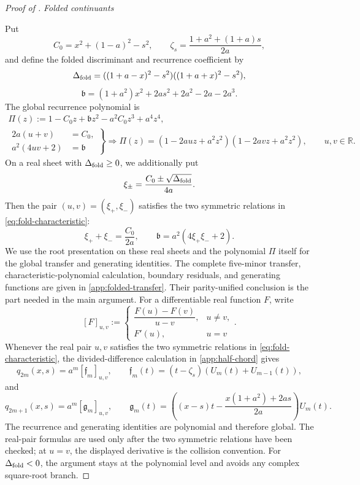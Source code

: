 \documentclass[12pt,anonymous]{iopjournal}
\numberwithin{equation}{section}
\theoremstyle{remark}
\newcommand{\proofstage}[1]{%
  \par\medskip\noindent\textit{#1}\par\nobreak\smallskip}
\begin{document}
\begin{proof}[Proof of ]
\proofstage{Folded continuants}
Put
\[
 C_0=x^2+(1-a)^2-s^2,\qquad
 \zeta_s=\frac{1+a^2+(1+a)s}{2a},
\]
and define the folded discriminant and recurrence coefficient by
\[
 \Delta_{\rm fold}=((1+a-x)^2-s^2)((1+a+x)^2-s^2),
\]
\[
 \mathfrak b=(1+a^2)x^2+2as^2+2a^2-2a-2a^3.
\]
The global recurrence polynomial is
\begin{equation}\label{eq:fold-characteristic}
\begin{gathered}
 \Pi(z):=1-C_0z+\mathfrak b z^2-a^2C_0z^3+a^4z^4,\\
 \left.
 \begin{aligned}
  2a(u+v)&=C_0,\\
  a^2(4uv+2)&=\mathfrak b
 \end{aligned}
 \right\}
 \Longrightarrow
 \Pi(z)=(1-2auz+a^2z^2)(1-2avz+a^2z^2),
 \qquad u,v\in\mathbb R.
\end{gathered}
\end{equation}
On a real sheet with \(\Delta_{\rm fold}\geq0\), we additionally put
\[
 \xi_\pm=\frac{C_0\pm\sqrt{\Delta_{\rm fold}}}{4a}.
\]
Then the pair \((u,v)=(\xi_+,\xi_-)\) satisfies the two symmetric
relations in \eqref{eq:fold-characteristic}:
\[
 \xi_++\xi_-=\frac{C_0}{2a},\qquad
 \mathfrak b=a^2(4\xi_+\xi_-+2).
\]
We use the root presentation on these real sheets and the polynomial
\(\Pi\) itself for the global transfer and generating identities.
The complete five-minor transfer, characteristic-polynomial calculation,
boundary residuals, and generating functions are given in
\cref{app:folded-transfer}.  Their parity-unified conclusion is the part
needed in the main argument.  For a differentiable real function \(F\), write
\[
 [F]_{u,v}:=
 \begin{cases}
  \dfrac{F(u)-F(v)}{u-v},&u\neq v,\\[2mm]
  F'(u),&u=v
 \end{cases}.
\]
Whenever the real pair \(u,v\) satisfies the two symmetric relations in
\eqref{eq:fold-characteristic}, the divided-difference calculation in
\cref{app:half-chord} gives
\begin{equation}\label{eq:fold-even}
 q_{2m}(x,s)=a^m[\mathfrak f_m]_{u,v},\qquad
 \mathfrak f_m(t)=(t-\zeta_s)(U_m(t)+U_{m-1}(t)),
\end{equation}
and
\begin{equation}\label{eq:fold-odd}
 q_{2m+1}(x,s)=a^m[\mathfrak g_m]_{u,v},\qquad
 \mathfrak g_m(t)=\left((x-s)t-
 \frac{x(1+a^2)+2as}{2a}\right)U_m(t).
\end{equation}
The recurrence and generating identities are polynomial and therefore
global.  The real-pair formulas are used only after the two symmetric
relations have been checked; at \(u=v\), the displayed derivative is the
collision convention.  For \(\Delta_{\rm fold}<0\), the argument stays at
the polynomial level and avoids any complex square-root branch.


\end{proof}
\end{document}
